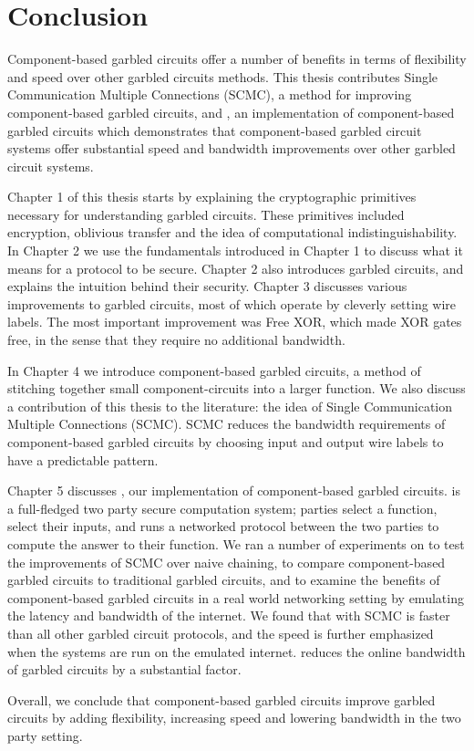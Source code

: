 
\chapter*{Conclusion}
	\setcounter{chapter}{4}
	\setcounter{section}{0}
	
Component-based garbled circuits offer a number of benefits in terms of flexibility and speed over other garbled circuits methods.
This thesis contributes Single Communication Multiple Connections (SCMC), a method for improving component-based garbled circuits, and \CompGC, an implementation of component-based garbled circuits which demonstrates that component-based garbled circuit systems offer substantial speed and bandwidth improvements over other garbled circuit systems.

Chapter 1 of this thesis starts by explaining the cryptographic primitives necessary for understanding garbled circuits.
These primitives included encryption, oblivious transfer and the idea of computational indistinguishability.
In Chapter 2 we use the fundamentals introduced in Chapter 1 to discuss what it means for a protocol to be secure. 
Chapter 2 also introduces garbled circuits, and explains the intuition behind their security.
Chapter 3 discusses various improvements to garbled circuits, most of which operate by cleverly setting wire labels.
The most important improvement was Free XOR, which made XOR gates free, in the sense that they require no additional bandwidth.

In Chapter 4 we introduce component-based garbled circuits, a method of stitching together small component-circuits into a larger function.
We also discuss a contribution of this thesis to the literature: the idea of Single Communication Multiple Connections (SCMC).
SCMC reduces the bandwidth requirements of component-based garbled circuits by choosing input and output wire labels to have a predictable pattern.

Chapter 5 discusses \CompGC, our implementation of component-based garbled circuits.
\CompGC is a full-fledged two party secure computation system; parties select a function, select their inputs, and \CompGC runs a networked protocol between the two parties to compute the answer to their function.
We ran a number of experiments on \CompGC to test the improvements of SCMC over naive chaining, to compare component-based garbled circuits to traditional garbled circuits, and to examine the benefits of component-based garbled circuits in a real world networking setting by emulating the latency and bandwidth of the internet.
We found that \CompGC with SCMC is faster than all other garbled circuit protocols, and the speed is further emphasized when the systems are run on the emulated internet.
\CompGC reduces the online bandwidth of garbled circuits by a substantial factor. 

Overall, we conclude that component-based garbled circuits improve garbled circuits by adding flexibility, increasing speed and lowering bandwidth in the two party setting.

